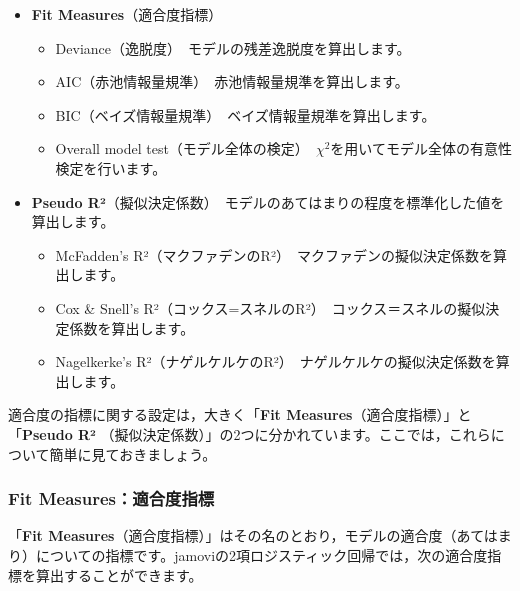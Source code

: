 \documentclass[
  12pt,
  a5jpaper,
  lualatex, ja=standard]{bxjsbook}
\providecommand{\tightlist}{%
  \setlength{\itemsep}{0pt}\setlength{\parskip}{0pt}}
\newenvironment{jmvsettings}{%
	\begin{center}%
	\begin{tcolorbox}[%
		title=設定項目,
		colframe=gmoji,
		colbacktitle=gmoji,
		colback=gmoji!2!white,
		breakable,
		width=.9\textwidth,
		]\small\addtolength{\leftmargini}{-3\labelsep}%
	}%
	{\end{tcolorbox}\end{center}}
\begin{document}
\begin{jmvsettings}

\begin{itemize}
\tightlist
\item
  \textbf{Fit Measures}（適合度指標）

  \begin{itemize}
  \tightlist
  \item
    Deviance（逸脱度）　モデルの残差逸脱度を算出します。
  \item
    AIC（赤池情報量規準）　赤池情報量規準を算出します。
  \item
    BIC（ベイズ情報量規準）　ベイズ情報量規準を算出します。
  \item
    Overall model test（モデル全体の検定）　\(\chi^{2}\)を用いてモデル全体の有意性検定を行います。
  \end{itemize}
\item
  \textbf{Pseudo R²}（擬似決定係数）　モデルのあてはまりの程度を標準化した値を算出します。

  \begin{itemize}
  \tightlist
  \item
    McFadden's R²（マクファデンのR²）　マクファデンの擬似決定係数を算出します。
  \item
    Cox \& Snell's R²（コックス=スネルのR²）　コックス＝スネルの擬似決定係数を算出します。
  \item
    Nagelkerke's R²（ナゲルケルケのR²）　ナゲルケルケの擬似決定係数を算出します。
  \end{itemize}
\end{itemize}

\end{jmvsettings}

適合度の指標に関する設定は，大きく「\textbf{Fit Measures}（適合度指標）」と「\textbf{Pseudo R² }（擬似決定係数）」の2つに分かれています。ここでは，これらについて簡単に見ておきましょう。

\hypertarget{fit-measuresux9069ux5408ux5ea6ux6307ux6a19-1}{%
\subsubsection*{Fit Measures：適合度指標}\label{fit-measuresux9069ux5408ux5ea6ux6307ux6a19-1}}

「\textbf{Fit Measures}（適合度指標）」はその名のとおり，モデルの適合度（あてはまり）についての指標です。jamoviの2項ロジスティック回帰では，次の適合度指標を算出することができます。
\end{document}
